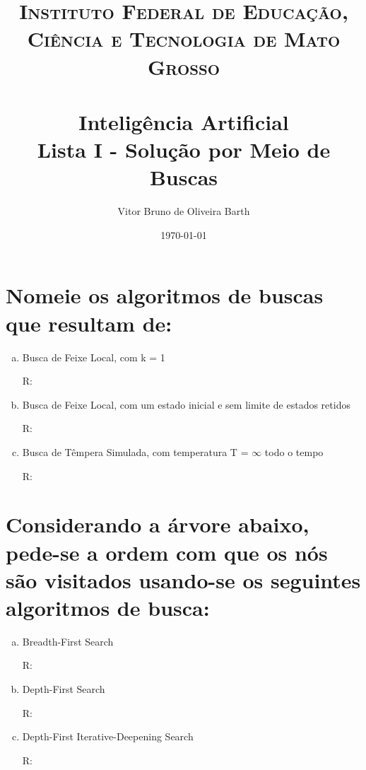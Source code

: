 \documentclass[paper=a4, fontsize=11pt]{scrartcl} %
\title{	
    \normalfont \normalsize 
    \textsc{Instituto Federal de Educação, Ciência e Tecnologia de Mato Grosso} \\ [25pt] %
    \horrule{0.5pt} \\[0.4cm] %
    \huge Inteligência Artificial \\ %
    \huge Lista I - Solução por Meio de Buscas
    \horrule{2pt} \\[0.5cm] %
    }
\author{Vitor Bruno de Oliveira Barth} %
\date{\normalsize\today} %
\begin{document}
    
    \maketitle
    
    
    \section{Nomeie os algoritmos de buscas que resultam de:}
    \begin{enumerate}[(a)]
        \item Busca de Feixe Local, com k = 1 
        \par R: 

        \item Busca de Feixe Local, com um estado inicial e sem limite de estados retidos
        \par R:

        \item Busca de Têmpera Simulada, com temperatura T = $\infty$ todo o tempo
        \par R:
    \end{enumerate}

    
    \section{Considerando a árvore abaixo, pede-se a ordem com que os nós são visitados usando-se os seguintes algoritmos de busca:}
    

    \begin{enumerate}[(a)]
        \item Breadth-First Search
        \par R: 

        \item Depth-First Search
        \par R:

        \item Depth-First Iterative-Deepening Search
        \par R:
    \end{enumerate}
\end{document}

